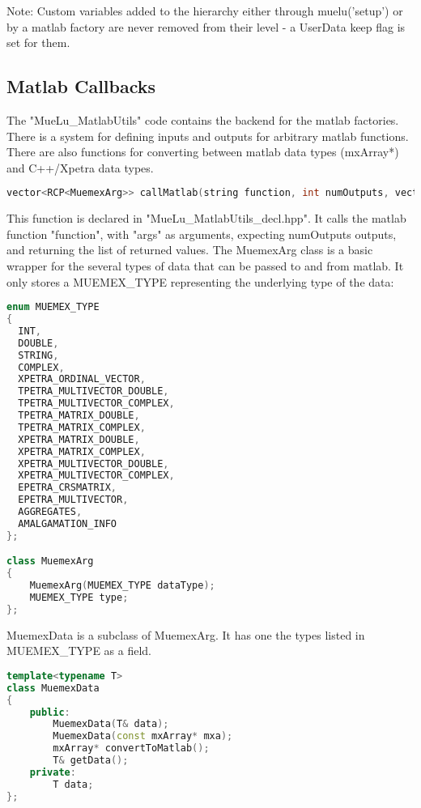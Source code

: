 Note: Custom variables added to the hierarchy either through muelu('setup') or
by a matlab factory are never removed from their level - a UserData keep
flag is set for them.

\subsection{Matlab Callbacks}

The "MueLu\_MatlabUtils" code contains the backend for the matlab factories.
There is a system for defining inputs and outputs for arbitrary matlab
functions. There are also functions for converting between matlab data types (mxArray*)
and C++/Xpetra data types.

\begin{lstlisting}[language=C++]
vector<RCP<MuemexArg>> callMatlab(string function, int numOutputs, vector<RCP<MuemexArg>> args);
\end{lstlisting}

This function is declared in "MueLu\_MatlabUtils\_decl.hpp". It calls the matlab function "function",
with "args" as arguments, expecting numOutputs outputs, and returning the list of returned values.
The MuemexArg class is a basic wrapper for the several types of data that can be passed to and from
matlab. It only stores a MUEMEX\_TYPE representing the underlying type of the data:

\begin{lstlisting}[language=C++]
enum MUEMEX_TYPE
{
  INT,
  DOUBLE,
  STRING,
  COMPLEX,
  XPETRA_ORDINAL_VECTOR,
  TPETRA_MULTIVECTOR_DOUBLE,
  TPETRA_MULTIVECTOR_COMPLEX,
  TPETRA_MATRIX_DOUBLE,
  TPETRA_MATRIX_COMPLEX,
  XPETRA_MATRIX_DOUBLE,
  XPETRA_MATRIX_COMPLEX,
  XPETRA_MULTIVECTOR_DOUBLE,
  XPETRA_MULTIVECTOR_COMPLEX,
  EPETRA_CRSMATRIX,
  EPETRA_MULTIVECTOR,
  AGGREGATES,
  AMALGAMATION_INFO
};

class MuemexArg
{
    MuemexArg(MUEMEX_TYPE dataType);
    MUEMEX_TYPE type;
};
\end{lstlisting}

MuemexData is a subclass of MuemexArg. It has one the types listed in MUEMEX\_TYPE as a field.

\begin{lstlisting}[language=C++]
template<typename T>
class MuemexData
{
    public:
        MuemexData(T& data);
        MuemexData(const mxArray* mxa);
        mxArray* convertToMatlab();
        T& getData();
    private:
        T data;
};
\end{lstlisting}

